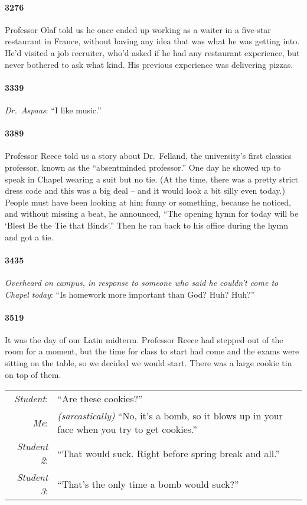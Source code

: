 \documentclass[10pt]{memoir}
\newcommand{\speakertag}[1]{\emph{#1}: }
\newcommand{\st}{\speakertag}
\newcommand{\intro}[1]{\emph{#1}}
\begin{document}
\paragraph{3276} Professor Olaf told us he once ended up working as a waiter in a five-star restaurant in France, without having any idea that was what he was getting into. He'd visited a job recruiter, who'd asked if he had any restaurant experience, but never bothered to ask what kind. His previous experience was delivering pizzas.

\paragraph{3339} \intro{Dr.\ Aspaas}: ``I like music.''

\paragraph{3389} Professor Reece told us a story about Dr.\ Felland, the university's first classics professor, known as the ``absentminded professor.'' One day he showed up to speak in Chapel wearing a suit but no tie. (At the time, there was a pretty strict dress code and this was a big deal -- and it would look a bit silly even today.) People must have been looking at him funny or something, because he noticed, and without missing a beat, he announced, ``The opening hymn for today will be `Blest Be the Tie that Binds'.'' Then he ran back to his office during the hymn and got a tie.

\paragraph{3435} \intro{Overheard on campus, in response to someone who said he couldn't come to Chapel today}: ``Is homework more important than God? Huh? Huh?''

\paragraph{3519} It was the day of our Latin midterm. Professor Reece had stepped out of the room for a moment, but the time for class to start had come and the exams were sitting on the table, so we decided we would start. There was a large cookie tin on top of them.\\

\noindent \begin{tabularx}{\textwidth}{r X}
\st{Student} & ``Are these cookies?'' \\
\st{Me} & \emph{(sarcastically)} ``No, it's a bomb, so it blows up in your face when you try to get cookies.''\\
\st{Student 2} & ``That would suck. Right before spring break and all.''\\
\st{Student 3} & ``That's the only time a bomb would suck?''
\end{tabularx}
\end{document}
